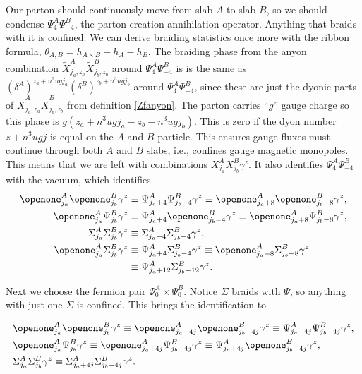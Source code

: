 Our parton should continuously move from slab $A$ to slab $B$, so we should condense $\Psi^A_{4}\Psi^B_{-4}$, the parton creation annihilation operator. Anything that braids with it is confined. We can derive braiding statistics once more with the ribbon formula, $\theta_{A,B}=h_{A \times B}-h_A-h_B$. The braiding phase from the anyon combination $\tilde{X}^A_{j_a,z_a}\tilde{X}^B_{j_b,z_b}$ around $\Psi^A_{4}\Psi^B_{-4}$ is is the same as $(\delta^A)^{z_a+n^3ugj_a}(\delta^B)^{z_b+n^3ugj_b}$ around $\Psi^A_{4}\Psi^B_{-4}$, since these are just the dyonic parts of $\tilde{X}^A_{j_a,z_a}\tilde{X}^B_{j_b,z_b}$ from definition \ref{Zfanyon}. The parton carries ``$g$'' gauge charge so this phase is  $g(z_a+n^3ugj_a-z_b-n^3ugj_b)$. This is zero if the dyon number $z+n^3ugj$ is equal on the $A$ and $B$ particle. This ensures gauge fluxes must continue through both $A$ and $B$ slabs, i.e., confines gauge magnetic monopoles. This means that we are left with combinations ${X}^A_{j_a}{X}^B_{j_b}\gamma^z$. It also identifies $\Psi^A_{4}\Psi^B_{-4}$ with the vacuum, which identifies 
\
\begin{align*}
\openone^A_{j_a}\openone^B_{j_b}\gamma^z&\equiv\Psi^A_{j_a+4}\Psi^B_{j_b-4}\gamma^z \equiv\openone^A_{j_a+8}\openone^B_{j_b-8}\gamma^z, \\
\openone^A_{j_a}\Psi^B_{j_b}\gamma^z&\equiv\Psi^A_{j_a+4}\openone^B_{j_b-4}\gamma^z \equiv\openone^A_{j_a+8}\Psi^B_{j_b-8}\gamma^z, \\
\Sigma^A_{j_a}\Sigma^B_{j_b}\gamma^z&\equiv\Sigma^A_{j_a+4}\Sigma^B_{j_b-4}\gamma^z, \\
\openone^A_{j_a}\Sigma^B_{j_b}\gamma^z&\equiv\Psi^A_{j_a+4}\Sigma^B_{j_b-4}\gamma^z \equiv\openone^A_{j_a+8}\Sigma^B_{j_b-8}\gamma^z\\
&\equiv\Psi^A_{j_a+12}\Sigma^B_{j_b-12}\gamma^z.
\end{align*}

Next we choose the fermion pair $\Psi_0^A \times \Psi^B_0$. Notice $\Sigma$ braids with $\Psi$, so anything with just one $\Sigma$ is confined. This brings the identification to

\begin{align*}
&\openone^A_{j_a}\openone^B_{j_b}\gamma^z  \equiv\openone^A_{j_a+4j}\openone^B_{j_b-4j}\gamma^z  \equiv\Psi^A_{j_a+4j}\Psi^B_{j_b-4j}\gamma^z, \\
&\openone^A_{j_a}\Psi^B_{j_b}\gamma^z  \equiv\openone^A_{j_a+4j}\Psi^B_{j_b-4j}\gamma^z \equiv\Psi^A_{j_a+4j}\openone^B_{j_b-4j}\gamma^z, \\
&\Sigma^A_{j_a}\Sigma^B_{j_b}\gamma^z\equiv\Sigma^A_{j_a+4j}\Sigma^B_{j_b-4j}\gamma^z. 
\end{align*}

